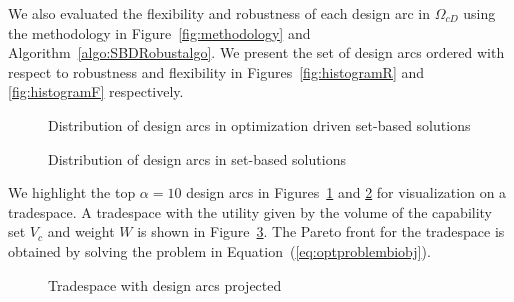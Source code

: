 We also evaluated the flexibility and robustness of each design arc in $\Omega_{cD}$ using the methodology in Figure~\ref{fig:methodology} and Algorithm~\ref{algo:SBDRobustalgo}. We present the set of design arcs ordered with respect to robustness and flexibility in Figures~\ref{fig:histogramR} and \ref{fig:histogramF} respectively.

\begin{figure}[h!]
	\centering
	 \hspace{0.1\textwidth}%
	 \hspace{0.1\textwidth}%
	\caption{Distribution of design arcs in optimization driven set-based solutions}
	\label{fig:histogramplotsSBD}
\end{figure}

\begin{figure}[h!]
	\centering
	 \hspace{0.1\textwidth}%
	 \hspace{0.1\textwidth}%
	\caption{Distribution of design arcs in set-based solutions}
	\label{fig:histogramplots}
\end{figure}

We highlight the top $\alpha = 10$ design arcs in Figures~\ref{fig:histogramplotsSBD} and \ref{fig:histogramplots} for visualization on a tradespace. A tradespace with the utility given by the volume of the capability set $V_c$ and weight $W$ is shown in Figure~\ref{fig:tradespaceSBD}. The Pareto front for the tradespace is obtained by solving the problem in Equation~(\ref{eq:optproblembiobj}).

\begin{figure}[h!]
	\centering
	 \hspace{0.1\textwidth}%
	 \hspace{0.1\textwidth}%
	\caption{Tradespace with design arcs projected}
	\label{fig:tradespaceSBD}
\end{figure}

